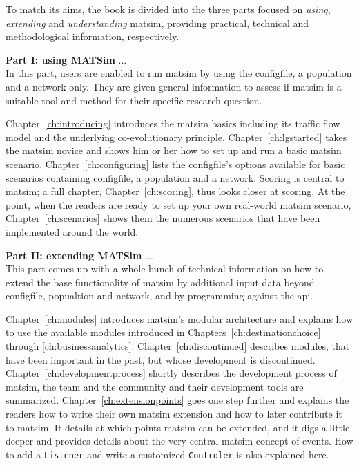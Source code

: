 To match its aims, the book is divided into the three parts focused on \emph{using}, \emph{extending} and \emph{understanding} \gls{matsim}, providing practical, technical and methodological information, respectively. %

\textbf{Part I: using MATSim} ... \\
In this part, users are enabled to run \gls{matsim} by using the \gls{configfile}, a population and a network only. They are given general information to assess if \gls{matsim} is a suitable tool and method for their specific research question.

Chapter~\ref{ch:introducing} introduces the \gls{matsim} basics including its traffic flow model and the underlying co-evolutionary principle. 
Chapter~\ref{ch:lgstarted} takes the \gls{matsim} novice and shows him or her how to set up and run a basic \gls{matsim} \gls{scenario}. 
Chapter~\ref{ch:configuring} lists the \gls{configfile}'s options available for basic scenarios containing \gls{configfile}, a population and a network.  
Scoring is central to \gls{matsim}; a full chapter, Chapter~\ref{ch:scoring}, thus looks closer at scoring. 
At the point, when the readers are ready to set up your own real-world \gls{matsim} \gls{scenario}, Chapter~\ref{ch:scenarios} shows them the numerous scenarios that have been implemented around the world. 

\textbf{Part II: extending MATSim} ... \\
This part comes up with a whole bunch of technical information on how to extend the base functionality of \gls{matsim} by additional input data beyond \gls{configfile}, popualtion and network, and by programming against the \gls{api}. 

Chapter~\ref{ch:modules} introduces \gls{matsim}'s modular architecture and explains how to use the available \glspl{module} introduced in Chapters~\ref{ch:destinationchoice} through \ref{ch:businessanalytics}. Chapter~\ref{ch:discontinued} describes modules, that have been important in the past, but whose development is discontinued.
Chapter~\ref{ch:developmentprocess} shortly describes the development process of \gls{matsim}, \ie the team and the community and their development tools are summarized. 
Chapter~\ref{ch:extensionpoints} goes one step further and explains the readers how to write their own \gls{matsim} \gls{extension} and how to later contribute it to \gls{matsim}. It details at which points \gls{matsim} can be extended, and it digs a little deeper and provides details about the very central \gls{matsim} concept of \glspl{event}. How to add a \lstinline|Listener| and write a customized \lstinline|Controler| is also explained here.


